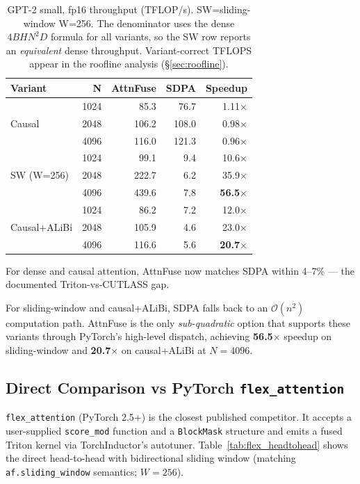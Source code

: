 \documentclass[10pt,twocolumn]{article}
\begin{document}
\begin{table}[H]
\centering
\caption{GPT-2 small, fp16 throughput (TFLOP/s). SW=sliding-window W=256.
The denominator uses the dense $4 B H N^2 D$ formula for all variants,
so the SW row reports an \emph{equivalent} dense throughput.
Variant-correct TFLOPS appear in the roofline analysis (\S\ref{sec:roofline}).}
\label{tab:fp16_gpt2}
\small
\begin{tabular}{lrrrr}
\toprule
\textbf{Variant} & \textbf{N} & \textbf{AttnFuse} & \textbf{SDPA} & \textbf{Speedup} \\
\midrule
\multirow{3}{*}{Causal}
  & 1024 &  85.3 &  76.7 & 1.11$\times$ \\
  & 2048 & 106.2 & 108.0 & 0.98$\times$ \\
  & 4096 & 116.0 & 121.3 & 0.96$\times$ \\
\midrule
\multirow{3}{*}{SW (W=256)}
  & 1024 &  99.1 &   9.4 & 10.6$\times$ \\
  & 2048 & 222.7 &   6.2 & 35.9$\times$ \\
  & 4096 & 439.6 &   7.8 & \textbf{56.5}$\times$ \\
\midrule
\multirow{3}{*}{Causal+ALiBi}
  & 1024 &  86.2 &   7.2 & 12.0$\times$ \\
  & 2048 & 105.9 &   4.6 & 23.0$\times$ \\
  & 4096 & 116.6 &   5.6 & \textbf{20.7}$\times$ \\
\bottomrule
\end{tabular}
\end{table}

For dense and causal attention, AttnFuse now matches SDPA within
4--7\% --- the documented Triton-vs-CUTLASS gap.

For sliding-window and causal+ALiBi, SDPA falls back to an
$\mathcal{O}(n^2)$ computation path. AttnFuse is the only
\emph{sub-quadratic} option that supports these variants through
PyTorch's high-level dispatch, achieving \textbf{56.5$\times$} speedup
on sliding-window and \textbf{20.7$\times$} on causal+ALiBi at $N{=}4096$.

\subsection{Direct Comparison vs PyTorch \texttt{flex\_attention}}
\label{sec:flex}

\texttt{flex\_attention} (PyTorch 2.5+) is the closest published
competitor. It accepts a user-supplied \texttt{score\_mod} function and
a \texttt{BlockMask} structure and emits a fused Triton kernel via
TorchInductor's autotuner. Table~\ref{tab:flex_headtohead} shows the
direct head-to-head with bidirectional sliding window
(matching \texttt{af.sliding\_window} semantics; $W=256$).
\end{document}
